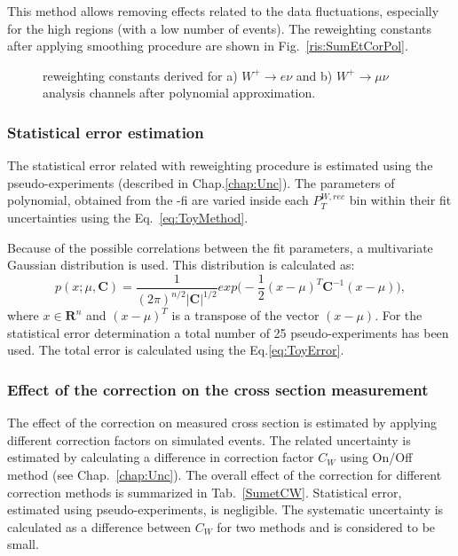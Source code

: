 This method allows removing effects related to the data fluctuations, especially for the high \sumet regions (with a low number of events). The reweighting constants after applying smoothing procedure are shown in Fig.~\ref{ris:SumEtCorPol}. 

\begin{figure}[!tbp]
\begin{minipage}[h]{0.49\linewidth}
\end{minipage}
\hfill
\begin{minipage}[h]{0.49\linewidth}
\end{minipage}
\caption{\sumet reweighting constants derived for a) $W^{+} \to e \nu$ and b) $W^{+} \to \mu \nu$ analysis channels after polynomial approximation.}
\end{figure}

\subsubsection{Statistical error estimation}

The statistical error related with \sumet reweighting procedure is estimated using the pseudo-experiments (described in Chap.\ref{chap:Unc}). The parameters of polynomial, obtained from the \chiD-fi are varied inside each $P_T^{W, rec}$ bin within their fit uncertainties using the Eq.~\ref{eq:ToyMethod}. 

Because of the possible correlations between the fit parameters, a multivariate Gaussian distribution is used. This distribution is calculated as:
\begin{equation}
p(x;\mu, \mathbf{C}) =\frac{1}{(2\pi)^{n/2}|\mathbf{C}|^{1/2}} exp\Big(-\frac{1}{2}(x-\mu)^{T}\mathbf{C}^{-1}(x-\mu)\Big),
\end{equation}
where $x \in \boldsymbol{R}^{n}$ and $(x-\mu)^{T}$ is a transpose of the vector $(x-\mu)$. For the statistical error determination a total number of 25 pseudo-experiments has been used. The total error is calculated using the Eq.\ref{eq:ToyError}.

\subsubsection{Effect of the \sumet correction on the cross section measurement}
The effect of the \sumet correction on measured cross section is estimated by applying different correction factors on simulated events. The related uncertainty is estimated by calculating a difference in correction factor $C_{W}$ using On/Off method (see Chap.~\ref{chap:Unc}). The overall effect of the \sumet correction for different correction methods is summarized in Tab.~\ref{SumetCW}. Statistical error, estimated using pseudo-experiments, is negligible. The systematic uncertainty is calculated as a difference between $C_{W}$ for two methods and is considered to be small. 

